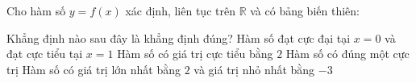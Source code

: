 \begin{ex}%
Cho hàm số $y=f(x)$ xác định, liên tục trên $\mathbb{R}$ và có bảng biến thiên:
\begin{center}
\end{center}
Khẳng định nào sau đây là khẳng định đúng?
\choice
{\True Hàm số đạt cực đại tại $x=0$ và đạt cực tiểu tại $x=1$}
{Hàm số có giá trị cực tiểu bằng $2$}
{Hàm số có đúng một cực trị}
{Hàm số có giá trị lớn nhất bằng $2$ và giá trị nhỏ nhất bằng $-3$} 
\end{ex}

